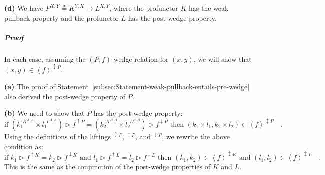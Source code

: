 \textbf{(d)} We have $P^{X,Y}\triangleq K^{Y,X}\rightarrow L^{X,Y}$,
where the profunctor $K$ has the weak pullback property and the profunctor
$L$ has the post-wedge property.%
\begin{comment}
\textbf{(e)} We have a recursive type $P^{X,Y}\triangleq S^{X,Y,P^{X,Y}}$,
where $S^{X,Y,R}$ is contravariant in $X$ and covariant in $Y$
and $R$, and has the post-wedge property when viewed as a profunctor
with respect to $X$ and $Y$. Does the post-wedge really hold for
$P$?
\end{comment}


\subparagraph{Proof}

In each case, assuming the $\left(P,f\right)$-wedge relation for
$(x,y)$, we will show that $(x,y)\in\left<f\right>^{\updownarrow P}$. 

\textbf{(a)} The proof of Statement~\ref{subsec:Statement-weak-pullback-entails-pre-wedge}
also derived the post-wedge property of $P$.

\textbf{(b)} We need to show that $P$ has the post-wedge property:
\[
\text{if }(k_{1}^{:K^{A,A}}\times l_{1}^{:L^{A,A}})\triangleright f^{\uparrow P}=(k_{2}^{:K^{B,B}}\times l_{2}^{:L^{B,B}})\triangleright f^{\downarrow P}\text{ then }(k_{1}\times l_{1},k_{2}\times l_{2})\in\left<f\right>^{\updownarrow P}\quad.
\]
Using the definitions of the liftings $^{\updownarrow P}$, $^{\uparrow P}$,
and $^{\downarrow P}$, we rewrite the above condition as:
\[
\text{if }k_{1}\triangleright f^{\uparrow K}=k_{2}\triangleright f^{\downarrow K}\text{ and }l_{1}\triangleright f^{\uparrow L}=l_{2}\triangleright f^{\downarrow L}\text{ then }(k_{1},k_{2})\in\left<f\right>^{\updownarrow K}\text{ and }(l_{1},l_{2})\in\left<f\right>^{\updownarrow L}\quad.
\]
This is the same as the conjunction of the post-wedge properties of
$K$ and $L$. 

